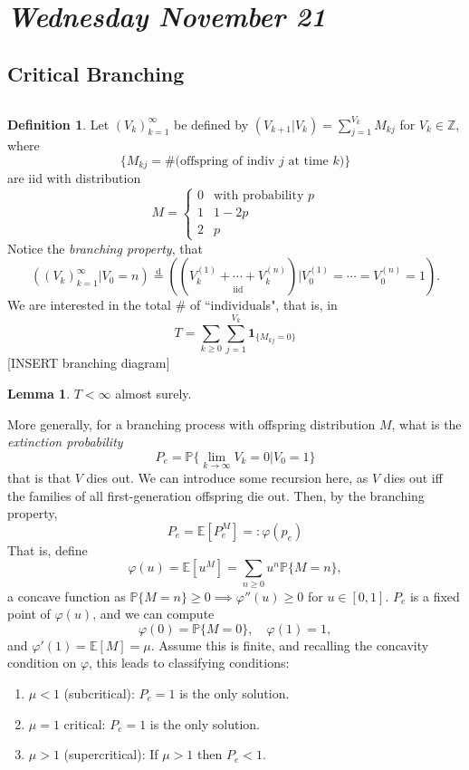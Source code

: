 \documentclass[../../../Master/AppliedStochastics.tex]{subfiles}
\newcommand{\disteq}{\overset{ \text{d} }{=}}
\newcommand{\Z}{\mathbb{Z}}    %
\newcommand{\E}{\mathbb{E}}    %
\renewcommand{\P}{\mathbb{P}}  %
\theoremstyle{definition}
\newtheorem{lemma}[thm]{Lemma}
\newtheorem{defn}[thm]{Definition}
\begin{document}
\section{\emph{Wednesday November 21}} 

\subsection{Critical Branching} $\,$

\begin{defn}

Let $(V_k)_{k=1} ^\infty$ be defined by $(V_{k+1} | V_k) = \sum_{j=1} ^{V_k} M_{kj}$ for $V_k \in \Z$, where 
$$
\{ M_{kj} = \# \text{(offspring of indiv $j$ at time $k$)} \} 
$$
are iid with distribution 
$$
M = 
\begin{cases}
0 & \text{with probability $p$} \\
1 & 1 - 2p\\
2 & p
\end{cases}
$$
Notice the \emph{branching property}, that
$$
( (V_k)_{k=1} ^\infty | V_0 = n ) \disteq ( ( \underset{ \text{iid} }{ V_k ^{(1)} + \cdots + V_k ^{(n)}} ) | V_0 ^{(1)} = \cdots = V_0 ^{(n)} = 1).
$$
We are interested in the total \# of ``individuals", that is, in 
$$
T = \sum_{k \geq 0} \sum_{j=1} ^{V_k} \mathbf{1}_{ \{ M_{kj} = 0 \} }
$$ 
[INSERT branching diagram]


\end{defn}


\begin{lemma}
$T < \infty$ almost surely.
\end{lemma}

More generally, for a branching process with offspring distribution $M$, what is the \emph{extinction probability}
$$
P_e = \P \{ \lim_{k \to \infty} V_k = 0 | V_0 = 1 \}
$$
that is that $V$ dies out. We can introduce some recursion here, as $V$ dies out iff the families of all first-generation offspring die out. Then, by the branching property, 
$$
P_e = \E [P_e^M] =: \varphi ( p_e)
$$
That is, define 
$$
\varphi (u) = \E [u^M] = \sum_{n \geq 0} u^n \P \{ M=n \},
$$
a concave function as $ \P \{ M=n \} \geq 0 \implies \varphi '' (u) \geq 0$ for $u \in [0,1]$. $P_e$ is a fixed point of $\varphi(u)$, and we can compute 
$$
\varphi (0) = \P \{ M = 0 \}, \quad \varphi (1) = 1,
$$
and $\varphi' (1) = \E [ M ] = \mu$. Assume this is finite, and recalling the concavity condition on $\varphi$, this leads to classifying conditions:

\begin{enumerate}
\item $\mu < 1$ (subcritical): $P_e = 1$ is the only solution.
\item $\mu = 1$ critical: $P_e = 1$ is the only solution.
\item $\mu > 1$ (supercritical): If $\mu > 1$ then $P_e < 1$. 
\end{enumerate}
\end{document}
